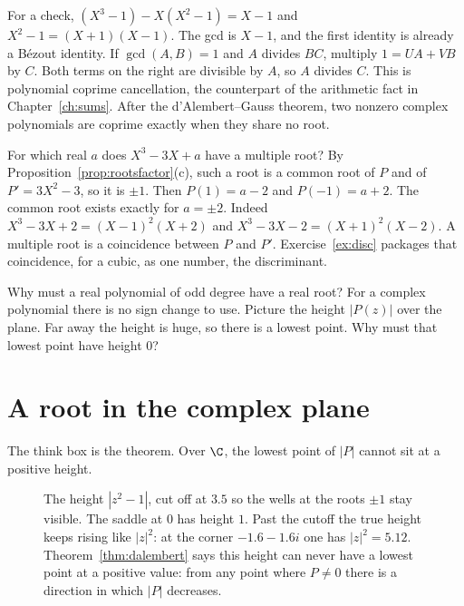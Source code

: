 For a check, $(X^3-1)-X(X^2-1)=X-1$ and $X^2-1=(X+1)(X-1)$. The gcd is $X-1$, and the first identity is already a B\'ezout identity. If $\gcd(A,B)=1$ and $A$ divides $BC$, multiply $1=UA+VB$ by $C$. Both terms on the right are divisible by $A$, so $A$ divides $C$. This is polynomial coprime cancellation, the counterpart of the arithmetic fact in Chapter~\ref{ch:sums}. After the d'Alembert--Gauss theorem, two nonzero complex polynomials are coprime exactly when they share no root.

\begin{examplex}
For which real $a$ does $X^3-3X+a$ have a multiple root? By Proposition~\ref{prop:rootsfactor}(c), such a root is a common root of $P$ and of $P'=3X^2-3$, so it is $\pm1$. Then $P(1)=a-2$ and $P(-1)=a+2$. The common root exists exactly for $a=\pm2$. Indeed $X^3-3X+2=(X-1)^2(X+2)$ and $X^3-3X-2=(X+1)^2(X-2)$. A multiple root is a coincidence between $P$ and $P'$. Exercise~\ref{ex:disc} packages that coincidence, for a cubic, as one number, the discriminant.
\end{examplex}

\begin{think}
Why must a real polynomial of odd degree have a real root? For a complex polynomial there is no sign change to use. Picture the height $|P(z)|$ over the plane. Far away the height is huge, so there is a lowest point. Why must that lowest point have height $0$?
\end{think}

\section{A root in the complex plane}

The think box is the theorem. Over $\C$, the lowest point of $|P|$ cannot sit at a positive height.

\begin{figure}[ht]
\centering
{}
\caption{The height $|z^2-1|$, cut off at $3.5$ so the wells at the roots $\pm1$ stay visible. The saddle at $0$ has height $1$. Past the cutoff the true height keeps rising like $|z|^2$: at the corner $-1.6-1.6i$ one has $|z|^2=5.12$. Theorem~\ref{thm:dalembert} says this height can never have a lowest point at a positive value: from any point where $P\ne0$ there is a direction in which $|P|$ decreases.}
\label{fig:landscape}
\end{figure}

